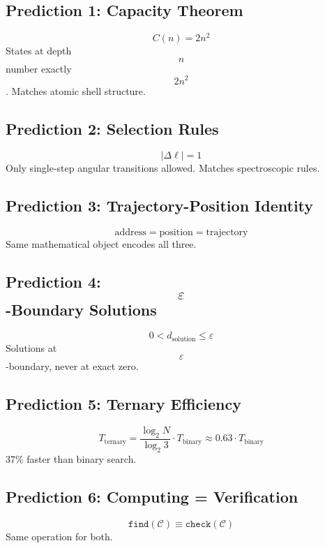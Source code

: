 \documentclass[11pt,twocolumn,a4paper]{article}
\theoremstyle{definition}
\theoremstyle{remark}
\begin{document}
\subsection{Prediction 1: Capacity Theorem}
\begin{equation}
C(n) = 2n^2
\end{equation}
States at depth $$n$$ number exactly $$2n^2$$. Matches atomic shell structure.

\subsection{Prediction 2: Selection Rules}
\begin{equation}
|\Delta \ell| = 1
\end{equation}
Only single-step angular transitions allowed. Matches spectroscopic rules.

\subsection{Prediction 3: Trajectory-Position Identity}
\begin{equation}
\text{address} = \text{position} = \text{trajectory}
\end{equation}
Same mathematical object encodes all three.

\subsection{Prediction 4: $$\varepsilon$$-Boundary Solutions}
\begin{equation}
0 < d_{\text{solution}} \leq \varepsilon
\end{equation}
Solutions at $$\varepsilon$$-boundary, never at exact zero.

\subsection{Prediction 5: Ternary Efficiency}
\begin{equation}
T_{\text{ternary}} = \frac{\log_2 N}{\log_2 3} \cdot T_{\text{binary}} \approx 0.63 \cdot T_{\text{binary}}
\end{equation}
37\% faster than binary search.

\subsection{Prediction 6: Computing = Verification}
\begin{equation}
\texttt{find}(\mathcal{C}) \equiv \texttt{check}(\mathcal{C})
\end{equation}
Same operation for both.
\end{document}
